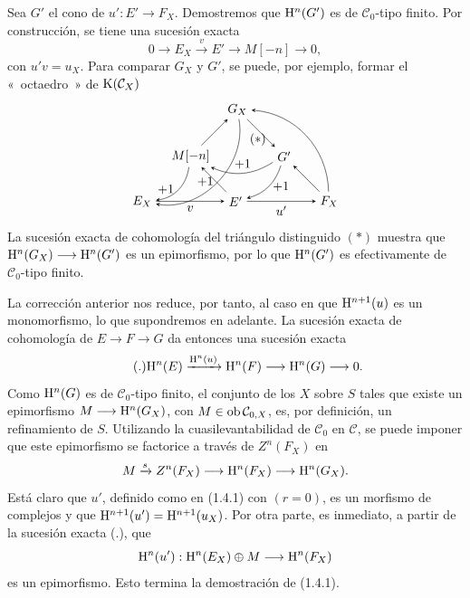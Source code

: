 Sea \(G'\) el cono de \(u':E'\to F_X\). Demostremos que \(\mathrm H^n(G')\) es de \(\mathcal C_0\)-tipo finito. Por construcción, se tiene una sucesión exacta
\[
  0\longrightarrow E_X\xrightarrow{v}E'\longrightarrow M[-n]\longrightarrow 0,
\]
con \(u'v=u_X\). Para comparar \(G_X\) y \(G'\), se puede, por ejemplo, formar el «~octaedro~» de \(\mathrm K(\mathcal C_X)\)
\[
\begin{tikzpicture}[>=stealth,baseline=(GX.base),node distance=1.0cm]
  \node (EX) at (0,0) {$E_X$};
  \node (Ep) at (2.6,0) {$E'$};
  \node (FX) at (5.2,0) {$F_X$};
  \node (M)  at (1.35,1.25) {$M[-n]$};
  \node (GX) at (2.65,2.55) {$G_X$};
  \node (Gp) at (3.95,1.25) {$G'$};
  \node at (3.22,1.72) {$(*)$};
  \draw[->] (EX) -- node[below] {$v$} (Ep);
  \draw[->] (Ep) -- node[below] {$u'$} (FX);
  \draw[->] (Ep) -- (M);
  \draw[->] (M) -- (GX);
  \draw[->] (GX) -- (Gp);
  \draw[->] (FX) -- (Gp);
  \draw[->] (M) to[bend left=38] node[left] {$+1$} (EX);
  \draw[->] (Gp) to[bend left=28] node[above] {$+1$} (M);
  \draw[->] (Gp) to[bend left=28] node[right] {$+1$} (Ep);
  \draw[->] (GX) to[bend left=55] node[left] {$+1$} (EX);
  \draw[->] (FX) to[bend right=42] (GX);
\end{tikzpicture}
\]
La sucesión exacta de cohomología del triángulo distinguido \((*)\) muestra que \(\mathrm H^n(G_X)\longrightarrow \mathrm H^n(G')\) es un epimorfismo, por lo que \(\mathrm H^n(G')\) es efectivamente de \(\mathcal C_0\)-tipo finito.

La corrección anterior nos reduce, por tanto, al caso en que \(\mathrm H^{n+1}(u)\) es un monomorfismo, lo que supondremos en adelante. La sucesión exacta de cohomología de \(E\to F\to G\) da entonces una sucesión exacta
\begin{equation}\tag{.}
  \mathrm H^n(E)\xrightarrow{\mathrm H^n(u)}
  \mathrm H^n(F)\longrightarrow \mathrm H^n(G)\longrightarrow 0.
\end{equation}
Como \(\mathrm H^n(G)\) es de \(\mathcal C_0\)-tipo finito, el conjunto de los \(X\) sobre \(S\) tales que existe un epimorfismo \(M\longrightarrow \mathrm H^n(G_X)\), con \(M\in\operatorname{ob}\mathcal C_{0,X}\), es, por definición, un refinamiento de \(S\). Utilizando la cuasilevantabilidad de \(\mathcal C_0\) en \(\mathcal C\), se puede imponer que este epimorfismo se factorice a través de \(Z^n(F_X)\) en
\[
  M\xrightarrow{s}Z^n(F_X)\longrightarrow \mathrm H^n(F_X)\longrightarrow \mathrm H^n(G_X).
\]
Está claro que \(u'\), definido como en (1.4.1) con \((r=0)\), es un morfismo de complejos y que \(\mathrm H^{n+1}(u')=\mathrm H^{n+1}(u_X)\). Por otra parte, es inmediato, a partir de la sucesión exacta (.), que
\[
  \mathrm H^n(u'):\mathrm H^n(E_X)\oplus M\longrightarrow \mathrm H^n(F_X)
\]
es un epimorfismo. Esto termina la demostración de (1.4.1).

